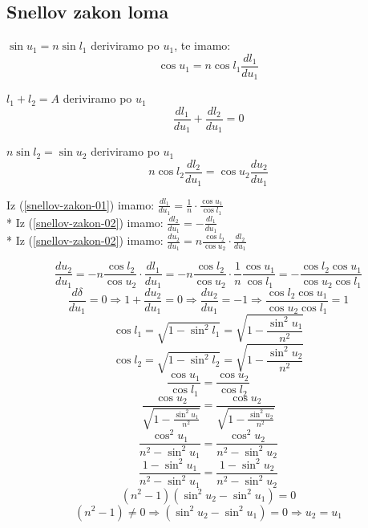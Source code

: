 \documentclass{report}
\begin{document}
\subsection{Snellov zakon loma}

\noindent $\sin u_1 = n \sin l_1$ deriviramo po $u_1$, te imamo:
\begin{equation}
	\cos u_1 = n \cos l_1 \frac{dl_1}{du_1}
	\label{snellov-zakon-01}
\end{equation}

\noindent $l_1 + l_2 = A$ deriviramo po $u_1$
\begin{equation}
	\frac{dl_1}{du_1} + \frac{dl_2}{du_1} = 0
	\label{snellov-zakon-02}
\end{equation}

\noindent $n \sin l_2 = \sin u_2$ deriviramo po $u_1$
\begin{equation}
	n \cos l_2 \frac{dl_2}{du_1} = \cos u_2 \frac{du_2}{du_1}
	\label{snellov-zakon-03}
\end{equation}

\noindent Iz (\ref{snellov-zakon-01}) imamo: $\frac{dl_1}{du_1} = \frac{1}{n} \cdot \frac{\cos u_1}{\cos l_1}$\\*
Iz (\ref{snellov-zakon-02}) imamo: $\frac{dl_2}{du_1} = - \frac{dl_1}{du_1}$\\*
Iz (\ref{snellov-zakon-02}) imamo: $\frac{du_2}{du_1} = n \frac{\cos l_2}{\cos u_2} \cdot \frac{dl_2}{du_1}$

$$\frac{du_2}{du_1} = -n \frac{\cos l_2}{\cos u_2} \cdot \frac{dl_1}{du_1} = - n \frac{\cos l_2}{\cos u_2} \cdot \frac{1}{n} \frac{\cos u_1}{\cos l_1} = - \frac{\cos l_2 \cos u_1}{\cos u_2 \cos l_1}$$
$$\frac{d \delta}{d u_1} = 0 \Rightarrow 1 + \frac{du_2}{du_1} = 0 \Rightarrow \frac{du_2}{du_1} = -1 \Rightarrow \frac{\cos l_2 \cos u_1}{\cos u_2 \cos l_1} = 1$$
$$\cos l_1 = \sqrt{1-\sin ^2 l_1} = \sqrt{1 - \frac{\sin ^2 u_1}{n^2}}$$
$$\cos l_2 = \sqrt{1 - \sin ^2 l_2} = \sqrt{1 - \frac{\sin ^2 u_2}{n^2}}$$
$$\frac{\cos u_1}{\cos l_1} = \frac{\cos u_2}{\cos l_2}$$
$$\frac{\cos u_2}{\sqrt{1-\frac{\sin ^2 u_1}{n^2}}} = \frac{\cos u_2}{\sqrt{1-\frac{\sin ^2 u_2}{n^2}}}$$
$$\frac{\cos ^2 u_1}{n^2 - \sin ^2 u_1} = \frac{\cos ^2 u_2}{n^2 - \sin ^2 u_2}$$
$$\frac{1-\sin^2 u_1}{n^2 - \sin ^2 u_1} = \frac{1 - \sin ^2 u_2}{n^2 - \sin ^2 u_2}$$
$$(n^2 - 1)(\sin^2 u_2 - \sin ^2 u_1) = 0$$
$$(n^2 - 1) \neq 0 \Rightarrow (\sin^2 u_2 - \sin ^2 u_1) = 0 \Rightarrow u_2 = u_1$$
\begin{center}
\end{center}
\end{document}
